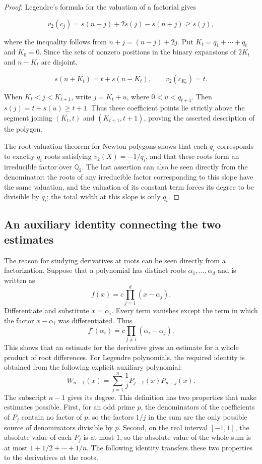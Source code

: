 \documentclass[11pt,a4paper]{article}
\numberwithin{equation}{section}
\theoremstyle{definition}
\begin{document}
\begin{proof}
Legendre's formula for the valuation of a factorial gives

\begin{equation}
v_2(c_j)=s(n-j)+2s(j)-s(n+j)\ge s(j),
\label{eq:old2.1}
\end{equation}

where the inequality follows from \(n+j=(n-j)+2j\). Put \(K_t=q_1+\cdots+q_t\) and \(K_0=0\). Since the sets of nonzero positions in the binary expansions of \(2K_t\) and \(n-K_t\) are disjoint,

\[
s(n+K_t)=t+s(n-K_t),\qquad v_2(c_{K_t})=t.
\]

When \(K_t<j<K_{t+1}\), write \(j=K_t+u\), where \(0<u<q_{t+1}\). Then \(s(j)=t+s(u)\ge t+1\). Thus these coefficient points lie strictly above the segment joining \((K_t,t)\) and \((K_{t+1},t+1)\), proving the asserted description of the polygon.

The root-valuation theorem for Newton polygons shows that each \(q_i\) corresponds to exactly \(q_i\) roots satisfying \(v_2(X)=-1/q_i\), and that these roots form an irreducible factor over \(\mathbb Q_2\). The last assertion can also be seen directly from the denominator: the roots of any irreducible factor corresponding to this slope have the same valuation, and the valuation of its constant term forces its degree to be divisible by \(q_i\); the total width at this slope is only \(q_i\).
\end{proof}

\subsection{An auxiliary identity connecting the two estimates}

The reason for studying derivatives at roots can be seen directly from a factorization. Suppose that a polynomial has distinct roots \(\alpha_1,\ldots,\alpha_d\) and is written as
\[
f(x)=c\prod_{j=1}^d(x-\alpha_j).
\]
Differentiate and substitute \(x=\alpha_i\). Every term vanishes except the term in which the factor \(x-\alpha_i\) was differentiated. Thus
\[
f'(\alpha_i)=c\prod_{j\ne i}(\alpha_i-\alpha_j).
\]
This shows that an estimate for the derivative gives an estimate for a whole product of root differences. For Legendre polynomials, the required identity is obtained from the following explicit auxiliary polynomial:
\begin{equation}
W_{n-1}(x)=\sum_{j=1}^n\frac1jP_{j-1}(x)P_{n-j}(x).
\label{eq:old3.1}
\end{equation}
The subscript \(n-1\) gives its degree. This definition has two properties that make estimates possible. First, for an odd prime \(p\), the denominators of the coefficients of \(P_j\) contain no factor of \(p\), so the factors \(1/j\) in the sum are the only possible source of denominators divisible by \(p\). Second, on the real interval \([-1,1]\), the absolute value of each \(P_j\) is at most \(1\), so the absolute value of the whole sum is at most \(1+1/2+\cdots+1/n\). The following identity transfers these two properties to the derivatives at the roots.
\end{document}
